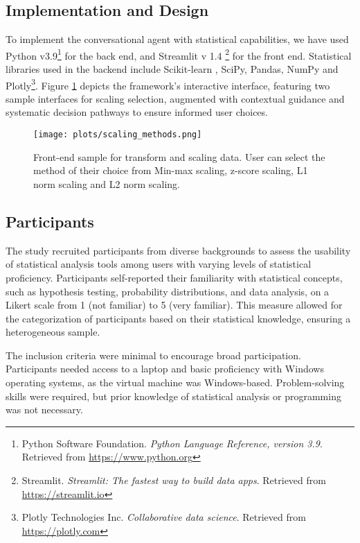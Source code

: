 \documentclass{article}
\begin{document}
 \subsection{Implementation and Design}
To implement the conversational agent with statistical capabilities, we have used Python v3.9\footnote{Python Software Foundation. \textit{Python Language Reference, version 3.9}. Retrieved from \url{https://www.python.org}}  for the back end, and Streamlit v 1.4 \footnote{Streamlit. \textit{Streamlit: The fastest way to build data apps}. Retrieved from \url{https://streamlit.io}} for the front end. Statistical libraries used in the backend include Scikit-learn \cite{pedregosa2011scikit}, SciPy\cite{2020SciPy-NMeth}, Pandas\cite{mckinney2010data}, NumPy\cite{harris2020array} and Plotly\footnote{Plotly Technologies Inc. 
    \textit{Collaborative data science}. 
    Retrieved from \url{https://plotly.com}}.
Figure \ref{fig:frontend_scaling} depicts the framework's interactive interface, featuring two sample interfaces for scaling selection, augmented with contextual guidance and systematic decision pathways to ensure informed user choices.

\begin{figure}[h!]
    \centering
    \texttt{[image: plots/scaling\_methods.png]}
    \caption{Front-end sample for transform and scaling data. User can select the method of their choice from Min-max scaling, z-score scaling, L1 norm scaling and L2 norm scaling.}
    \label{fig:frontend_scaling}
\end{figure}



\subsection{Participants}

The study recruited participants from diverse backgrounds to assess the usability of statistical analysis tools among users with varying levels of statistical proficiency. Participants self-reported their familiarity with statistical concepts, such as hypothesis testing, probability distributions, and data analysis, on a Likert scale from 1 (not familiar) to 5 (very familiar). This measure allowed for the categorization of participants based on their statistical knowledge, ensuring a heterogeneous sample. 

The inclusion criteria were minimal to encourage broad participation. Participants needed access to a laptop and basic proficiency with Windows operating systems, as the virtual machine was Windows-based. Problem-solving skills were required, but prior knowledge of statistical analysis or programming was not necessary.
\end{document}

